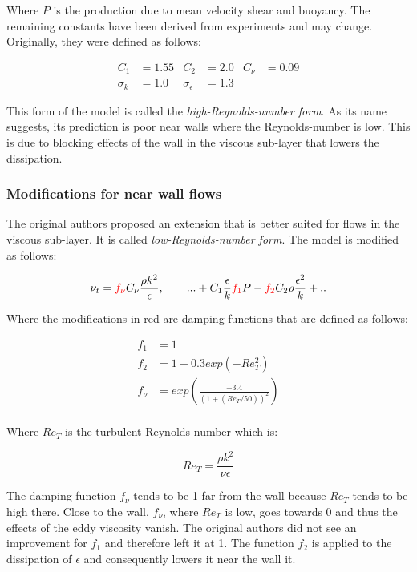 \noindent Where $P$ is the production due to mean velocity shear and buoyancy.
The remaining constants have been derived from experiments and may change.
Originally, they were defined as follows:

\begin{align*}
    C_1 &= 1.55         & C_2               &= 2.0  & C_{\nu} &= 0.09\\
    \sigma_k &= 1.0     & \sigma_{\epsilon} &= 1.3
\end{align*}

\noindent This form of the model is called the \textit{high-Reynolds-number
form}. As its name suggests, its prediction is poor near walls where the
Reynolds-number is low. This is due to blocking effects of the wall in the
viscous sub-layer that lowers the dissipation. 


\subsubsection{Modifications for near wall flows}
The original authors proposed an extension that is better suited for flows in
the viscous sub-layer. It is called \textit{low-Reynolds-number form}. The
model is modified as follows:

\begin{align}
    \nu_t = \textcolor{red}{f_{\nu}} C_{\nu} \frac{\rho k^2}{\epsilon},  \qquad
%
    ... + C_1 \frac{\epsilon}{k}\textcolor{red}{f_1} P 
    - \textcolor{red}{f_2} C_2 \rho \frac{\epsilon^2}{k} + ..
\end{align}

\noindent Where the modifications in red are damping functions that are defined
as follows:

\begin{align}
    f_1 &= 1 \\
    f_2 &= 1 - 0.3 exp(-Re_T^2) \\
    f_{\nu} &= exp \left( \frac{-3.4}{(1 + (Re_T/50))^2}\right) \\
\end{align}

\noindent Where $Re_T$ is the turbulent Reynolds number which is:

\begin{equation}
    Re_T = \frac{\rho k^2}{\nu \epsilon} 
\end{equation}

\noindent The damping function $f_{\nu}$ tends to be 1 far from the wall
because $Re_T$ tends to be high there. Close to the wall, $f_{\nu}$, where
$Re_T$ is low, goes towards 0 and thus the effects of the eddy viscosity
vanish. The original authors did not see an improvement for $f_1$ and therefore
left it at 1. The function $f_2$ is applied to the dissipation of $\epsilon$
and consequently lowers it near the wall it.


